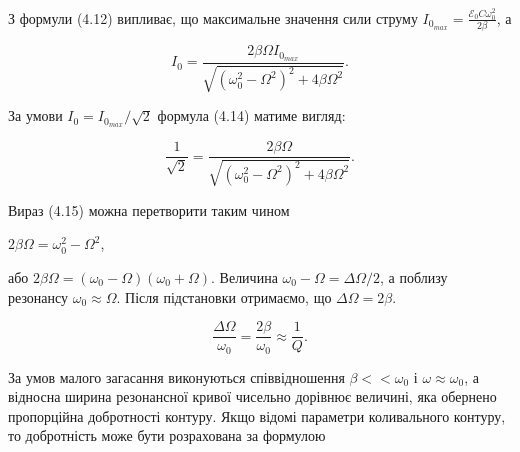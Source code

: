 \documentclass[12pt,a4paper]{article}
\begin{document}
    З формули (4.12) випливає,
    що максимальне значення сили струму $\displaystyle I_{0_{max}} = \frac{\mathcal{E}_0 C \omega_0^2}{2\beta}$,
    а

    \vspace{0.5em}

    \begin{equation}
        I_0 = \frac{2\beta \Omega I_{0_{max}}}{\sqrt{\left(\omega_0^2 - \Omega^2 \right)^2 + 4\beta \Omega^2}}.
        \tag{4.14}
    \end{equation}

    \vspace{0.5em}

    За умови $I_0 = I_{0_{max}} / \sqrt{2}$ формула (4.14) матиме вигляд:

    \vspace{0.5em}

    \begin{equation}
        \frac{1}{\sqrt{2}} = \frac{2\beta \Omega}{\sqrt{\left(\omega_0^2 - \Omega^2 \right)^2 + 4\beta \Omega^2}}.
        \tag{4.15}
    \end{equation}

    \vspace{0.5em}

    Вираз (4.15) можна перетворити таким чином

    \vspace{0.5em}

    \begin{center}
        $\displaystyle 2\beta \Omega = \omega_0^2 - \Omega^2$,
    \end{center}

    \vspace{0.5em}

    або $2\beta \Omega = (\omega_0 - \Omega)(\omega_0 + \Omega)$.
    Величина $\omega_0 - \Omega = \Delta \Omega / 2$, а
    поблизу резонансу $\omega_0 \approx \Omega$.
    Після підстановки отримаємо, що $\Delta \Omega = 2\beta$.

    \vspace{0.5em}

    \begin{equation}
        \frac{\Delta \Omega}{\omega_0} = \frac{2 \beta}{\omega_0} \approx \frac{1}{Q}.
        \tag{4.16}
    \end{equation}

    \vspace{0.5em}

    За умов малого загасання виконуються
    співвідношення $\beta << \omega_0$ і $\omega \approx \omega_0$, а відносна ширина
    резонансної кривої чисельно дорівнює величині,
    яка обернено пропорційна добротності контуру.
    Якщо відомі параметри коливального контуру,
    то добротність може бути розрахована за формулою
\end{document}
